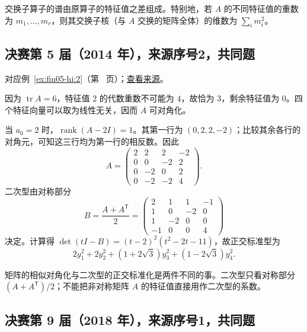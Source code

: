 \documentclass[12pt,fontset=fandol]{ctexart}
\begin{document}
\begin{remark}[方法与条件]

交换子算子的谱由原算子的特征值之差组成。特别地，若 $A$ 的不同特征值的重数为 $m_1,\ldots,m_r$，则其交换子核（与 $A$ 交换的矩阵全体）的维数为 $\sum_i m_i^2$。

\end{remark}

\subsection{决赛第 5 届（2014 年），来源序号2，共同题}\label{ans:fin05-hi:2}\label{pr:fin05-hi:2}

对应例~\ref{ex:fin05-hi:2}（第~\pageref{ex:fin05-hi:2} 页）；\href{https://github.com/lzxcr/cmc-mathematics/blob/64916fa1fdbc3e444a652eca204d5669058ee321/src/problems/finals/05/02.md}{查看来源}。

\begin{solve}

因为 $\operatorname{tr}A=6$，特征值 $2$ 的代数重数不可能为 $4$，故恰为 $3$，剩余特征值为 $0$。四个特征向量可以取为线性无关，因而 $A$ 可对角化。

当 $a_0=2$ 时，$\operatorname{rank}(A-2I)=1$。其第一行为 $(0,2,2,-2)$；比较其余各行的对角元，可知这三行均为第一行的相反数。因此
\[
A=\begin{pmatrix}2&2&2&-2\\0&0&-2&2\\0&-2&0&2\\0&-2&-2&4\end{pmatrix}.
\]
二次型由对称部分
\[
B=\frac{A+A^{\mathsf T}}2
=\begin{pmatrix}2&1&1&-1\\1&0&-2&0\\1&-2&0&0\\-1&0&0&4\end{pmatrix}
\]
决定。计算得
$\det(tI-B)=(t-2)^2(t^2-2t-11)$，故正交标准型为
\[
2y_1^2+2y_2^2+(1+2\sqrt3)y_3^2+(1-2\sqrt3)y_4^2.
\]

\end{solve}

\begin{remark}[方法与条件]

矩阵的相似对角化与二次型的正交标准化是两件不同的事。二次型只看对称部分 $(A+A^{\mathsf T})/2$；不能把非对称矩阵 $A$ 的特征值直接用作二次型的系数。

\end{remark}

\subsection{决赛第 9 届（2018 年），来源序号1，共同题}\label{ans:fin09-hi:1}\label{pr:fin09-hi:1}
\end{document}
